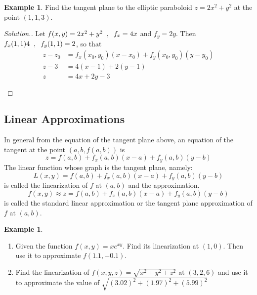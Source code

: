 \documentclass[11pt,a4paper]{article}
\theoremstyle{definition}
\newtheorem{exa}[thm]{Example}
\newenvironment{solution}
  {\renewcommand{\qedsymbol}{}\begin{proof}[\textit{Solution}.]}
  {\end{proof}}
\begin{document}
\begin{exa}


Find the tangent plane to the elliptic paraboloid $z = 2x^2 + y^2$ at the point $(1,1,3)$.
\end{exa}


\begin{solution}


Let $f(x,y) = 2x^2 + y^2\hspace{0.2cm} , \hspace{0.2cm} f_x = 4x$ and $f_y = 2y$. Then $f_x(1,1) 4\hspace{0.2cm} , \hspace{0.2cm} f_y (1,1) =2$, so that
\begin{align*}
z - z_0 & = f_x(x_0,y_0)(x - x_0) + f_y(x_0,y_0)(y - y_0)\\
z - 3 & = 4(x - 1) + 2(y - 1)\\
z & = 4x + 2y - 3\\\\
\end{align*}
\end{solution}

\subsection{Linear Approximations}
In general from the equation of the tangent plane above, an equation of the tangent at the point $(a,b,f(a,b))$ is $$z = f(a,b) + f_x(a,b)(x -a) + f_y(a,b)(y - b)$$ The linear function whose graph is the tangent plane, namely: $$L(x,y) = f(a,b) + f_x(a,b)(x -a) + f_y(a,b)(y - b)$$ is called the linearization of $f$ at $(a,b)$ and the approximation.
$$f(x,y) \approx z = f(a,b) + f_x(a,b)(x -a) + f_y(a,b)(y - b)$$ is called the standard linear approximation or the tangent plane approximation of $f$ at $(a,b)$.


\begin{exa}
\begin{enumerate}
\item Given the function $\displaystyle{f(x,y) = xe^{xy}}$. Find its linearization at $(1,0)$. Then use it to approximate $f(1.1,-0.1)$.
\item Find the linearization of $f(x,y,z) = \sqrt{x^2 + y^2 + z^2}$ at $(3,2,6)$ and use it to approximate the value of $\sqrt{(3.02)^2 + (1.97)^2 + (5.99)^2}$
\end{enumerate}
\end{exa}
\end{document}

